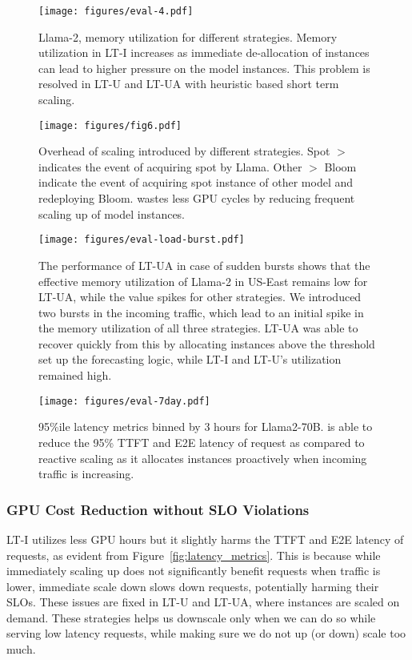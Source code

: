 \begin{figure}[t!]
    \centering
\texttt{[image: figures/eval-4.pdf]}
    \caption{Llama-2, memory utilization for different strategies. Memory utilization in LT-I increases as immediate de-allocation of instances can lead to higher pressure on the model instances. This problem is resolved in LT-U and LT-UA with heuristic based short term scaling.} 
    \label{fig:memory-util-box}
\end{figure}


\begin{figure}[t!]
    \centering
\texttt{[image: figures/fig6.pdf]}
    \caption{Overhead of scaling introduced by different strategies. Spot $>$ indicates the event of acquiring spot by Llama. Other $>$ Bloom indicate the event of acquiring spot instance of other model and redeploying Bloom. \sys wastes less GPU cycles by reducing frequent scaling up of model instances.} 
    \label{fig:cost-of-scaling}
\end{figure}

\begin{figure}[t!]
    \centering
\texttt{[image: figures/eval-load-burst.pdf]}
    \caption{The performance of LT-UA in case of sudden bursts shows that the effective memory utilization of Llama-2 in US-East remains low for LT-UA, while the value spikes for other strategies. We introduced two bursts in the incoming traffic, which lead to an initial spike in the memory utilization of all three strategies. LT-UA was able to recover quickly from this by allocating instances above the threshold set up the forecasting logic, while LT-I and LT-U's utilization remained high. 
    }
    \label{fig:load-burst}
\end{figure}

\begin{figure}[t!]
    \centering
\texttt{[image: figures/eval-7day.pdf]}
    \caption{95\%ile latency metrics binned by 3 hours for Llama2-70B. \sys is able to reduce the 95\% TTFT and E2E latency of request as compared to reactive scaling as it allocates instances proactively when incoming traffic is increasing.
    }
    \label{fig:latency-curve}
\end{figure}


\subsubsection{GPU Cost Reduction without SLO Violations}
LT-I utilizes less GPU hours but it slightly harms the TTFT and E2E latency of requests, as evident from Figure~\ref{fig:latency_metrics}. This is because while immediately scaling up does not significantly benefit requests when traffic is lower, immediate scale down slows down requests, potentially harming their SLOs. These issues are fixed in LT-U and LT-UA, where instances are scaled on demand. These strategies helps us downscale only when we can do so while serving low latency requests, while making sure we do not up (or down) scale too much.

